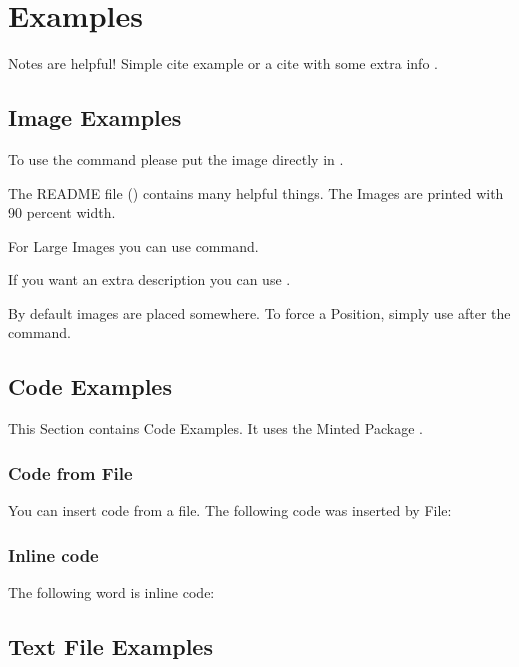 \chapter{Examples}
\label{chap:examples}

Notes are helpful!  Simple cite example \cite{github} or a cite with some extra info \cite[S. 1]{github}.

\section{Image Examples}
To use the \kotlin{\\image} command please put the image directly in . 

The README file () contains many helpful things. The Images are printed with 90 percent width.

\FloatBarrier 

For Large Images you can use \kotlin{\\imagebig} command.
\FloatBarrier 

If you want an extra description you can use \kotlin{\\imagedesc}.
\FloatBarrier 

By default images are placed somewhere. To force a Position, simply use \kotlin{\\FloatBarrier} after the \kotlin{\\image} command.



\section{Code Examples}
This Section contains Code Examples. It uses the Minted Package \cite{minted}.

\subsection{Code from File}
You can insert code from a file. The following code was inserted by File:

\subsection{Inline code}
The following word is inline code: 

\section{Text File Examples}

